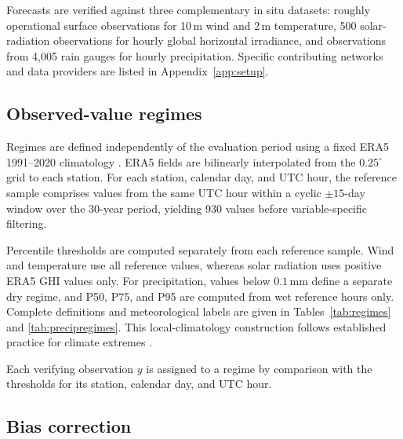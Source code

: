 \documentclass{article}
\begin{document}
Forecasts are verified against three complementary in situ datasets:
roughly operational surface observations for 10\,m wind and 2\,m temperature,
500 solar-radiation observations for hourly global horizontal irradiance, and
observations from 4{,}005 rain gauges for hourly precipitation. Specific
contributing networks and data providers are listed in
Appendix~\ref{app:setup}.

\subsection{Observed-value regimes}
\label{sec:thresholds}

Regimes are defined independently of the evaluation period using a fixed
ERA5 1991--2020 climatology \citep{hersbach2020era5}. ERA5 fields are
bilinearly interpolated from the \(0.25^\circ\) grid to each station. For
each station, calendar day, and UTC hour, the reference sample comprises
values from the same UTC hour within a cyclic \(\pm15\)-day window over the
30-year period, yielding 930 values before variable-specific filtering.

Percentile thresholds are computed separately from each reference sample.
Wind and temperature use all reference values, whereas solar radiation uses
positive ERA5 GHI values only. For precipitation, values below
\(0.1\,\mathrm{mm}\) define a separate dry regime, and P50, P75, and P95 are
computed from wet reference hours only. Complete definitions and
meteorological labels are given in Tables~\ref{tab:regimes} and
\ref{tab:precipregimes}. This local-climatology construction follows established practice for climate
extremes \citep{zhang2011indices,kleintank2009guidelines,
perkins2013heatwaves}.

Each verifying observation \(y\) is assigned to a
regime by comparison with the thresholds for its station, calendar day, and
UTC hour.

\subsection{Bias correction}
\label{sec:debias}
\end{document}
